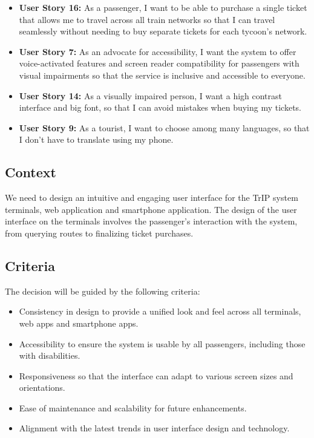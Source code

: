 \begin{itemize}
    \item \textbf{User Story 16:} As a passenger, I want to be able to purchase a single ticket that allows me to travel across all train networks so that I can travel seamlessly without needing to buy separate tickets for each tycoon's network.
    \item \textbf{User Story 7:} As an advocate for accessibility, I want the system to offer voice-activated features and screen reader compatibility for passengers with visual impairments so that the service is inclusive and accessible to everyone.
    \item \textbf{User Story 14:} As a visually impaired person, I want a high contrast interface and big font, so that I can avoid mistakes when buying my tickets.
    \item \textbf{User Story 9:} As a tourist, I want to choose among many languages, so that I don't have to translate using my phone.
\end{itemize}

\subsection*{Context}
We need to design an intuitive and engaging user interface for the TrIP system terminals, web application and smartphone application.
The design of the user interface on the terminals involves the passenger's interaction with the system, from querying routes to finalizing ticket purchases.

\subsection*{Criteria}
The decision will be guided by the following criteria:
\begin{itemize}
    \item Consistency in design to provide a unified look and feel across all terminals, web apps and smartphone apps.
    \item Accessibility to ensure the system is usable by all passengers, including those with disabilities.
    \item Responsiveness so that the interface can adapt to various screen sizes and orientations.
    \item Ease of maintenance and scalability for future enhancements.
    \item Alignment with the latest trends in user interface design and technology.
\end{itemize}

